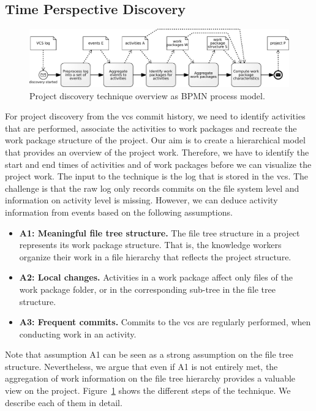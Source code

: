 \subsection{Time Perspective Discovery}\label{sec:subsec:discovery_technique}
\begin{figure}[b]
\centering
\includegraphics[width=\textwidth]{bpm2015/imgs/Project_discovery}
\caption{Project discovery technique overview as BPMN process model.}
\label{fig:project_discovery_technique}
\end{figure}
For project discovery from the \gls{vcs} commit history, we need to identify activities that are performed, associate the activities to work packages and recreate the work package structure of the project.
Our aim is to create a hierarchical model that provides an overview of the project work.
Therefore, we have to identify the start and end times of activities and of work packages before we can visualize the project work. The input to the technique is the log that is stored in the \gls{vcs}. The challenge is that the raw log only records commits on the file system level and information on activity level is missing. However, we can deduce activity information from events based on the following assumptions.

\begin{itemize}
  \item \textbf{A1: Meaningful file tree structure.} The file tree structure in a project represents its work package structure. That is, the knowledge workers organize their work in a file hierarchy that reflects the project structure.
  \item \textbf{A2: Local changes.} Activities in a work package affect only files of the work package folder, or in the corresponding sub-tree in the file tree structure.
  \item \textbf{A3: Frequent commits.} Commits to the \gls{vcs} are regularly performed, when conducting work in an activity.
\end{itemize}

Note that assumption A1 can be seen as a strong assumption on the file tree structure. Nevertheless, we argue that even if A1 is not entirely met, the aggregation of work information on the file tree hierarchy provides a valuable view on the project.
Figure~\ref{fig:project_discovery_technique} shows the different steps of the technique. We describe each of them in detail.

